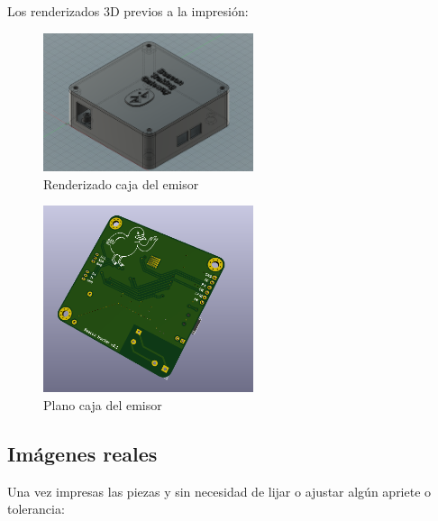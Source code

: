 \documentclass[a4paper ,12pt, onecolumn]{article}
\begin{document}
        Los renderizados 3D previos a la impresión:
        \begin{center}
            \begin{figure}[h]
                \centering
                \includegraphics[width=0.55\textwidth]{../mechanical_master.PNG}
                \caption{Renderizado caja del emisor}
                \label{fig:mesh1}
            \end{figure}
        \end{center}
        \begin{center}
            \begin{figure}[h]
                \centering
                \includegraphics[width=0.55\textwidth]{../receiver_2.PNG}
                \caption{Plano caja del emisor}
                \label{fig:mesh1}
            \end{figure}
        \end{center}

    \subsection{Imágenes reales}
        Una vez impresas las piezas y sin necesidad de lijar o ajustar algún apriete o tolerancia:
    
\end{document}
